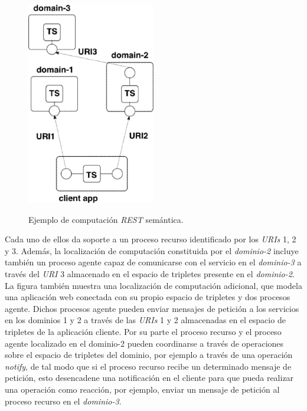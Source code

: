 \begin{figure}
\vspace{2.4in}
\caption{Ejemplo de computaci\'on \textit{REST} sem\'antica.}
\includegraphics[width=0.5\textwidth]{figura1}
\label{figura1}
\end{figure}

Cada uno de ellos da soporte a un proceso recurso identificado por los \textit{URIs} 1, 2 y 3. Adem\'as, la localizaci\'on de computaci\'on constituida por el \textit{dominio-2} incluye tambi\'en un proceso agente capaz de comunicarse con el servicio en el \textit{dominio-3} a trav\'es del \textit{URI} 3 almacenado en el espacio de tripletes presente en el \textit{dominio-2}. La figura tambi\'en muestra una localizaci\'on de computaci\'on adicional, que modela una aplicaci\'on web conectada con su propio espacio de tripletes y dos procesos agente. Dichos procesos agente pueden enviar mensajes de petici\'on a los servicios en los dominios 1 y 2 a trav\'es de las \textit{URIs} 1 y 2 almacenadas en el espacio de tripletes de la aplicaci\'on cliente. Por su parte el proceso recurso y el proceso agente localizado en el dominio-2 pueden coordinarse a trav\'es de operaciones sobre el espacio de tripletes del dominio,  por ejemplo a trav\'es de una operaci\'on \textit{notify}, de tal modo que si el proceso recurso recibe un determinado mensaje de petici\'on, esto desencadene una notificaci\'on en el cliente para que pueda realizar una operaci\'on como reacci\'on, por ejemplo, enviar un mensaje de petici\'on al proceso recurso en el \textit{dominio-3}.

